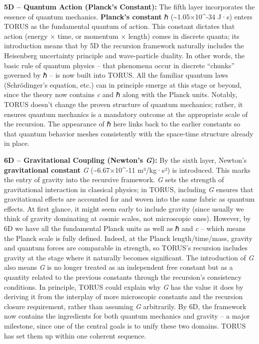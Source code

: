 \documentclass[
]{article}
\begin{document}
\textbf{5D -- Quantum Action (Planck's Constant):} The fifth layer
incorporates the essence of quantum mechanics. \textbf{Planck's
constant} ℏ (\textasciitilde1.05×10\^{}-34 J·s) enters TORUS as the
fundamental quantum of action. This constant dictates that action
(energy × time, or momentum × length) comes in discrete quanta; its
introduction means that by 5D the recursion framework naturally includes
the Heisenberg uncertainty principle and wave-particle duality. In other
words, the basic rule of quantum physics -- that phenomena occur in
discrete ``chunks'' governed by ℏ -- is now built into TORUS. All the
familiar quantum laws (Schrödinger's equation, etc.) can in principle
emerge at this stage or beyond, since the theory now contains \emph{c}
and ℏ along with the Planck units. Notably, TORUS doesn't change the
proven structure of quantum mechanics; rather, it ensures quantum
mechanics is a mandatory outcome at the appropriate scale of the
recursion. The appearance of ℏ here links back to the earlier constants
so that quantum behavior meshes consistently with the space-time
structure already in place.

\textbf{6D -- Gravitational Coupling (Newton's \emph{G}):} By the sixth
layer, Newton's \textbf{gravitational constant} \emph{G}
(\textasciitilde6.67×10\^{}-11 m³/kg·s²) is introduced. This marks the
entry of gravity into the recursive framework. \emph{G} sets the
strength of gravitational interaction in classical physics; in TORUS,
including \emph{G} ensures that gravitational effects are accounted for
and woven into the same fabric as quantum effects. At first glance, it
might seem early to include gravity (since usually we think of gravity
dominating at cosmic scales, not microscopic ones). However, by 6D we
have all the fundamental Planck units as well as ℏ and \emph{c} -- which
means the Planck scale is fully defined. Indeed, at the Planck
length/time/mass, gravity and quantum forces are comparable in strength,
so TORUS's recursion includes gravity at the stage where it naturally
becomes significant. The introduction of \emph{G} also means \emph{G} is
no longer treated as an independent free constant but as a quantity
related to the previous constants through the recursion's consistency
conditions. In principle, TORUS could explain why \emph{G} has the value
it does by deriving it from the interplay of more microscopic constants
and the recursion closure requirement, rather than assuming \emph{G}
arbitrarily. By 6D, the framework now contains the ingredients for both
quantum mechanics and gravity -- a major milestone, since one of the
central goals is to unify these two domains. TORUS has set them up
within one coherent sequence.
\end{document}
